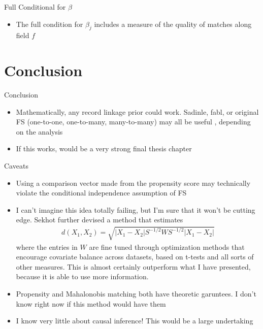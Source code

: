 \documentclass{beamer}
\begin{document}
\begin{frame}{Full Conditional for $\beta$}
	\begin{itemize}
		\item The full condition for $\beta_j$ includes a measure of the quality of matches along field $f$
	\end{itemize}
\end{frame}

\section{Conclusion}

\begin{frame}{Conclusion}
	\begin{itemize}
		\item Mathematically, any record linkage prior could work. Sadinle, fabl, or original FS (one-to-one, one-to-many, many-to-many) may all be useful , depending on the analysis
		\item If this works, would be a very strong final thesis chapter
	\end{itemize}
\end{frame}

\begin{frame}{Caveats}
	\begin{itemize}
		\item Using a comparison vector made from the propensity score may technically violate the conditional independence assumption of FS
		\item I can't imagine this idea totally failing, but I'm sure that it won't be cutting edge. Sekhot further devised a method that estimates
		\begin{align}
			d(X_1, X_2) = \sqrt{|X_1 - X_2| S^{-1/2} W S^{-1/2} |X_1 - X_2|}
		\end{align}
		where the entries in $W$ are fine tuned through optimization methods that encourage covariate balance across datasets, based on t-tests and all sorts of other measures. This is almost certainly outperform what I have presented, because it is able to use more information.
		\item Propensity and Mahalonobis matching both have theoretic garuntees. I don't know right now if this method would have them
		\item I know very little about causal inference! This would be a large undertaking
	\end{itemize}
\end{frame}
\end{document}

